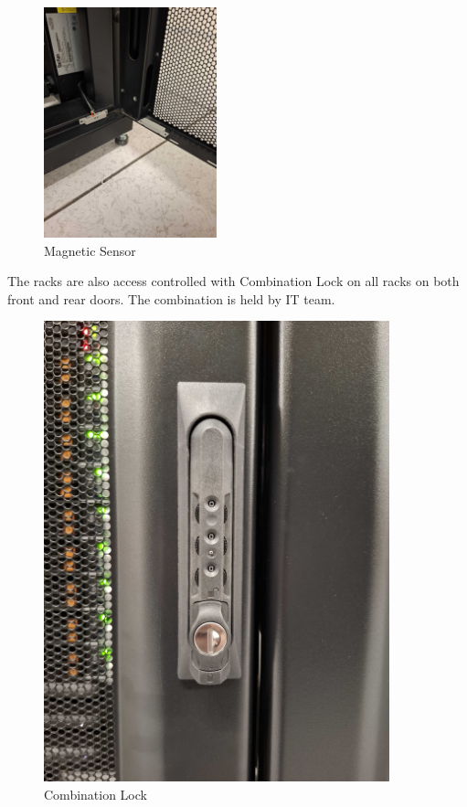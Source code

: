   \begin{figure}
    \includegraphics[width=5cm]{25.jpg}
    \centering
    \caption*{Magnetic Sensor}
  \end{figure}

  \newpage

The racks are also access controlled with Combination Lock on all racks on both front and rear doors. The combination is held by IT team.

\begin{figure}
    \includegraphics[width=10cm]{27.jpg}
    \centering
    \caption*{Combination Lock}
  \end{figure}

  \newpage
